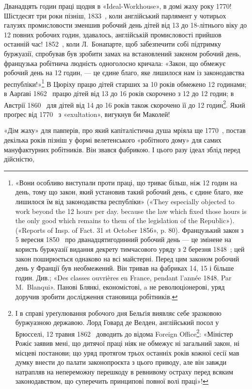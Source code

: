 Дванадцять годин праці щодня в «Ideal-Workhouse», в домі
жаху року 1770! Шістдесят три роки пізніш, 1833~, коли англійський
парлямент у чотирьох галузях промисловости зменшив
робочий день дітей від 13 до 18-літнього віку до 12 повних робочих
годин, здавалось, англійській промисловості прийшов останній
час! 1852~, коли Л.~Бонапарте, щоб забезпечити собі підтримку
буржуазії, спробував був зробити замах на встановлений
законом робочий день, французька робітнича людність одноголосно
кричала: «Закон, що обмежує робочий день на 12 годин, —
це єдине благо, яке лишилося нам із законодавства республіки!»\footnote{
«Вони особливо виступали проти праці, що триває більш, ніж
12 годин на день, тому що закон, який установив такий робочий день, є
єдине благо, яке лишилося їм від законодавства республіки» («They especially
objected to work beyond the 12 hours per day. because the law which
fixed those hours is the only good which remains to them of the legislation
of the Republic»). («Reports of Insp. of Fact. 31 st October 1856»,
p. 80). Французький закон з 5 вересня 1850~ про дванадцятигодинний
робочий день — це змінене на користь буржуазії видання декрету тимчасового
уряду з 2 березня 1848~; цей закон поширюється однаково на
всі майстерні. Перед цим законом робочий день у Франції був необмежений.
Він тривав на фабриках 14, 15 і більше годин. Див.; «Des classes
ouvrières en France, pendant l'année 1848. Par M.~Blanqui». Панові Блянкі,
економістові, a не революціонерові, уряд доручив зробити дослідження
становища робітників.
}
В Цюріху працю дітей старших за 10 років обмежено 12 годинами;
в Аарґаві 1862~ працю дітей від 13 до 16 років скорочено з 12
до 12 годин; в Австрії 1860~ для дітей від 14 до 16 років також
скорочено її до 12 годин\footnote{
І в справі уреґулювання робочого дня Бельґія виявляє себе зразковою
буржуазною державою. Лорд Говард де Велден, англійський посол
у Брюсселі, 12 травня 1862~ доводить до відома Foreign Office\footnote*{
— англійського міністерства закордонних справ. \emph{Ред.}
}: «Міністер
Рожіє заявив мені, що дитячої праці ніяк не обмежує ні загальний закон,
ні місцеві постанови; що уряд протягом трьох останніх років кожної сесії
мав думку внести до палати законопроєкта з цього приводу, але він завжди
натрапляв на непереможну перешкоду в ревнивому остраху перед
всяким законодавством, що суперечить принципові повної волі праці»!
}. Який проґрес від 1770~ з «exultation», вигукнув би Маколей!

«Дім жаху» для павперів, про який капіталістична душа
мріяла ще 1770~, постав декілька років пізніш у формі велетенського
«робітного дому» для самих мануфактурних робітників.
Він звався фабрикою. І цього разу ідеал зблід перед дійсністю,


